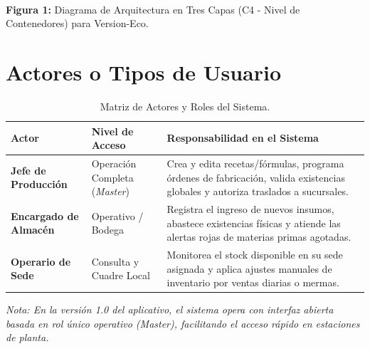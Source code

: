 \documentclass[11pt,a4paper]{article}
\begin{document}
\begin{center}
\\[2mm]
{\small \textbf{Figura 1:} Diagrama de Arquitectura en Tres Capas (C4 - Nivel de Contenedores) para Version-Eco.}
\end{center}

\section{Actores o Tipos de Usuario}

\begin{table}[htbp]
\centering
\small
\begin{tabularx}{\textwidth}{p{3.5cm} p{3.5cm} X}
\toprule
\textbf{Actor} & \textbf{Nivel de Acceso} & \textbf{Responsabilidad en el Sistema} \\
\midrule
\textbf{Jefe de Producción} & Operación Completa (\textit{Master}) & Crea y edita recetas/fórmulas, programa órdenes de fabricación, valida existencias globales y autoriza traslados a sucursales. \\
\addlinespace
\textbf{Encargado de Almacén} & Operativo / Bodega & Registra el ingreso de nuevos insumos, abastece existencias físicas y atiende las alertas rojas de materias primas agotadas. \\
\addlinespace
\textbf{Operario de Sede} & Consulta y Cuadre Local & Monitorea el stock disponible en su sede asignada y aplica ajustes manuales de inventario por ventas diarias o mermas. \\
\bottomrule
\end{tabularx}
\caption{Matriz de Actores y Roles del Sistema.}
\end{table}

\textit{Nota: En la versión 1.0 del aplicativo, el sistema opera con interfaz abierta basada en rol único operativo (Master), facilitando el acceso rápido en estaciones de planta.}
\end{document}
